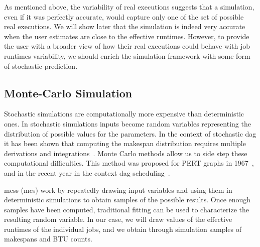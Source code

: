\documentclass[10pt,conference,compsocconf]{IEEEtran}
\begin{document}
As mentioned above, the variability of real executions suggests that a simulation,
even if it was  perfectly accurate, would capture only one of the set
of possible real executions. We will show later that  the simulation is indeed
very   accurate  when   the  user   estimates  are   close  to   the  effective
runtimes. However,  to  provide the user  with a broader view  of how
their real executions could behave with job runtimes variability,  we should 
enrich the simulation framework with some form of stochastic prediction.

\subsection{Monte-Carlo Simulation}\label{sec:MCS}

Stochastic  simulations are  computationally more  expensive than  deterministic
ones. In stochastic simulations inputs  become random variables representing the
distribution of possible values for the parameters. In the context of stochastic
\ac{dag} it has  been shown that computing the  makespan distribution requires
multiple derivations and  integrations~\cite{Ludwig01,Li97}. Monte Carlo methods
allow us to side step these computational difficulties. This method was proposed
for PERT  graphs in 1967~\cite{Slyke63}, and  in the recent year  in the context
\ac{dag} scheduling~\cite{Canon10,Zheng13}.

\aclp{mcs} (\acs{mcs})  work by  repeatedly drawing  input variables
and using  them in deterministic simulations  to obtain samples of  the possible
results. Once enough samples have been computed, traditional fitting can be used
to characterize the resulting random variable.  In our case, we will draw values
of  the  effective runtimes  of  the  individual  jobs,  and we  obtain  through
simulation samples of makespans and BTU counts.
\end{document}
